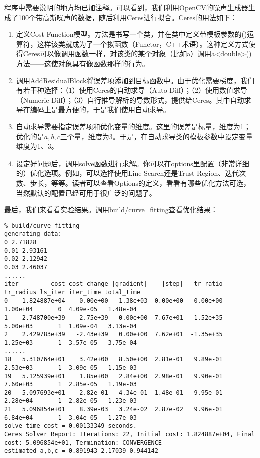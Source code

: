 程序中需要说明的地方均已加注释。可以看到，我们利用OpenCV的噪声生成器生成了100个带高斯噪声的数据，随后利用Ceres进行拟合。Ceres的用法如下：

\begin{enumerate}
	\item 定义Cost Function模型。方法是书写一个类，并在类中定义带模板参数的()运算符，这样该类就成为了一个拟函数（Functor，C++术语）。这种定义方式使得Ceres可以像调用函数一样，对该类的某个对象（比如a）调用a<double>()方法——这使对象具有像函数那样的行为。
	\item 调用AddResidualBlock将误差项添加到目标函数中。由于优化需要梯度，我们有若干种选择：（1）使用Ceres的自动求导（Auto Diff）；（2）使用数值求导（Numeric Diff）；（3）自行推导解析的导数形式，提供给Ceres。其中自动求导在编码上是最方便的，于是我们使用自动求导。
	\item 自动求导需要指定误差项和优化变量的维度。这里的误差是标量，维度为1；优化的是$a,b,c$三个量，维度为3。于是，在自动求导类的模板参数中设定变量维度为1、3。
	\item 设定好问题后，调用solve函数进行求解。你可以在options里配置（非常详细的）优化选项。例如，可以选择使用Line Search还是Trust Region、迭代次数、步长，等等。读者可以查看Options的定义，看看有哪些优化方法可选，当然默认的配置已经可用于很广泛的问题了。
\end{enumerate}

最后，我们来看看实验结果。调用build/curve\_fitting查看优化结果：
\begin{lstlisting}
% build/curve_fitting 
generating data: 
0 2.71828
0.01 2.93161
0.02 2.12942
0.03 2.46037
......
iter         cost cost_change |gradient|    |step|   tr_ratio tr_radius ls_iter iter_time total_time
0    1.824887e+04    0.00e+00   1.38e+03  0.00e+00   0.00e+00  1.00e+04       0  4.09e-05   1.48e-04
1    2.748700e+39   -2.75e+39   0.00e+00  7.67e+01  -1.52e+35  5.00e+03       1  1.09e-04   3.13e-04
2    2.429783e+39   -2.43e+39   0.00e+00  7.62e+01  -1.35e+35  1.25e+03       1  3.57e-05   3.75e-04
......
18   5.310764e+01    3.42e+00   8.50e+00  2.81e-01   9.89e-01  2.53e+03       1  3.09e-05   1.15e-03
19   5.125939e+01    1.85e+00   2.84e+00  2.98e-01   9.90e-01  7.60e+03       1  2.85e-05   1.19e-03
20   5.097693e+01    2.82e-01   4.34e-01  1.48e-01   9.95e-01  2.28e+04       1  2.82e-05   1.23e-03
21   5.096854e+01    8.39e-03   3.24e-02  2.87e-02   9.96e-01  6.84e+04       1  3.04e-05   1.27e-03
solve time cost = 0.00133349 seconds. 
Ceres Solver Report: Iterations: 22, Initial cost: 1.824887e+04, Final cost: 5.096854e+01, Termination: CONVERGENCE
estimated a,b,c = 0.891943 2.17039 0.944142
\end{lstlisting}

